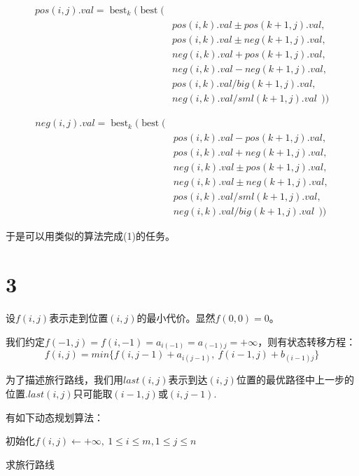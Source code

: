 \documentclass{ctexart}
\begin{document}
$$
\begin{aligned}
pos(i,j).val = \mathop{best}_k ( \mathop{best} (& \\
&pos(i,k).val \pm pos(k+1,j).val,\\
&pos(i,k).val \pm neg(k+1,j).val,\\
&neg(i,k).val + pos(k+1,j).val,\\
&neg(i,k).val - neg(k+1,j).val,\\
&pos(i,k).val / big(k+1,j).val,\\
& neg(i,k).val / sml(k+1,j).val \ \  ) )
\end{aligned}
$$

$$
\begin{aligned}
neg(i,j).val = \mathop{best}_k ( \mathop{best} (& \\
&pos(i,k).val - pos(k+1,j).val,\\
&pos(i,k).val + neg(k+1,j).val,\\
&neg(i,k).val \pm pos(k+1,j).val,\\
&neg(i,k).val \pm neg(k+1,j).val,\\
&pos(i,k).val / sml(k+1,j).val,\\
& neg(i,k).val / big(k+1,j).val \ \  ) )
\end{aligned}
$$

于是可以用类似的算法完成(1)的任务。



\section*{3}
设$f(i,j)$表示走到位置$(i,j)$的最小代价。显然$f(0,0)=0$。

我们约定$f(-1,j) = f(i,-1) = a_{i(-1)} = a_{(-1)j} =  + \infty $，则有状态转移方程：
$$
f(i,j) = min\{ f(i,j-1)+ a_{i(j-1)},\  f(i-1,j)+b_{(i-1)j}  \}
$$

为了描述旅行路线，我们用$last(i,j)$表示到达$(i,j)$位置的最优路径中上一步的位置.$last(i,j)$只可能取$(i-1,j)$或$(i,j-1)$.

有如下动态规划算法：


\begin{algorithm}[H]
  \SetAlgoLined

  初始化$f(i,j)\leftarrow + \infty,\ 1\le i \le m , 1 \le j \le n$\;
  \caption{求旅行路线}
\end{algorithm}
\end{document}
